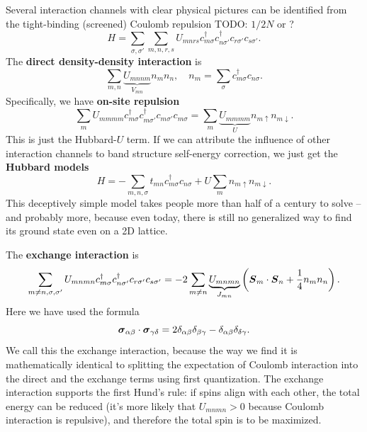 \documentclass[hyperref, a4paper]{report}
\newcommand*{\concept}[1]{{\textbf{#1}}}
\begin{document}
Several interaction channels with clear physical pictures 
can be identified from the tight-binding (screened) Coulomb repulsion
TODO: $1/2N$ or ?
\begin{equation}
    H = \sum_{\sigma, \sigma'} \sum_{m, n, r, s} 
    U_{mnrs} c^\dagger_{m \sigma} c^\dagger_{n \sigma'} c_{r \sigma'} c_{s \sigma'}.
\end{equation}
The \concept{direct density-density interaction} is 
\begin{equation}
    \sum_{m, n} \underbrace{U_{mnnm}}_{V_{mn}} n_m n_n, \quad n_m = \sum_\sigma c^\dagger_{m \sigma} c_{n \sigma}.
\end{equation}
Specifically, we have \concept{on-site repulsion}
\begin{equation}
    \sum_{m} U_{mmmm} c^\dagger_{m \sigma} c^\dagger_{m \sigma'} c_{m \sigma'} c_{m \sigma}
    = \sum_{m} \underbrace{U_{mmmm}}_U n_{m \uparrow} n_{m \downarrow}.
\end{equation}
This is just the Hubbard-$U$ term.
If we can attribute the influence of other interaction channels to
band structure self-energy correction,
we just get the \concept{Hubbard models}
\begin{equation}
    H = - \sum_{m, n, \sigma} t_{mn} c^\dagger_{m \sigma} c_{n \sigma}
    + U \sum_m n_{m \uparrow} n_{m \downarrow}.
\end{equation}
This deceptively simple model
takes people more than half of a century to solve 
-- and probably more, 
because even today, 
there is still no generalized way to find its ground state 
even on a 2D lattice.

The \concept{exchange interaction} is 
\begin{equation}
    \sum_{m \neq n, \sigma, \sigma'}
    U_{mnmn} c^\dagger_{m \sigma} c^\dagger_{n \sigma'} c_{r \sigma'} c_{s \sigma'}
    = - 2 \sum_{m \neq n} \underbrace{U_{mnmn}}_{J_{mn}} \left(
        \vb*{S}_m \cdot \vb*{S}_n + \frac{1}{4} n_m n_n
    \right).
\end{equation}
Here we have used the formula 
\begin{equation}
    \vb*{\sigma}_{\alpha \beta} \cdot \vb*{\sigma}_{\gamma \delta}
    = 2 \delta_{\alpha \beta} \delta_{\beta \gamma} - \delta_{\alpha \beta} \delta_{\delta \gamma}.
\end{equation}
We call this the exchange interaction, 
because the way we find it 
is mathematically identical to 
splitting the expectation of Coulomb interaction
into the direct and the exchange terms 
using first quantization.
The exchange interaction supports the first Hund's rule: 
if spins align with each other, 
the total energy can be reduced 
(it's more likely that $U_{mnmn} > 0$ because Coulomb interaction is repulsive),
and therefore the total spin is to be maximized.
\end{document}
